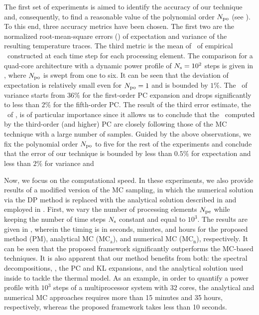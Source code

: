 
The first set of experiments is aimed to identify the accuracy of our technique and, consequently, to find a reasonable value of the polynomial order ${N_\text{po}}$ (see ). To this end, three accuracy metrics have been chosen. The first two are the normalized root-mean-square errors (\nrmse) of expectation and variance of the resulting temperature traces. The third metric is the mean of \nrmses\ of empirical \pdfs\ constructed at each time step for each processing element. The comparison for a quad-core architecture with a dynamic power profile of $N_\text{s} = 10^2$ steps is given in , where ${N_\text{po}}$ is swept from one to six. It can be seen that the deviation of expectation is relatively small even for ${N_\text{po}} = 1$ and is bounded by $1\%$. The \nrmse\ of variance starts from $36\%$ for the first-order PC expansion and drops significantly to less than $2\%$ for the fifth-order PC. The result of the third error estimate, the \nrmse\ of \pdfs, is of particular importance since it allows us to conclude that the \pdfs\ computed by the third-order (and higher) PC are closely following those of the MC technique with a large number of samples. Guided by the above observations, we fix the polynomial order ${N_\text{po}}$ to five for the rest of the experiments and conclude that the error of our technique is bounded by less than $0.5\%$ for expectation and less than $2\%$ for variance and \pdf


Now, we focus on the computational speed. In these experiments, we also provide results of a modified version of the MC sampling, in which the numerical solution via the DP method is replaced with the analytical solution described in  and employed in . First, we vary the number of processing elements ${N_\text{pe}}$ while keeping the number of time steps $N_\text{s}$ constant and equal to $10^3$. The results are given in , wherein the timing is in seconds, minutes, and hours for the proposed method (PM), analytical MC ($\text{MC}_\text{a}$), and numerical MC ($\text{MC}_\text{n}$), respectively. It can be seen that the proposed framework significantly outperforms the MC-based techniques. It is also apparent that our method benefits from both: the spectral decompositions, \ie, the PC and KL expansions, and the analytical solution used inside to tackle the thermal model. As an example, in order to quantify a power profile with $10^3$ steps of a multiprocessor system with 32 cores, the analytical and numerical MC approaches requires more than 15 minutes and 35 hours, respectively, whereas the proposed framework takes less than 10 seconds.

